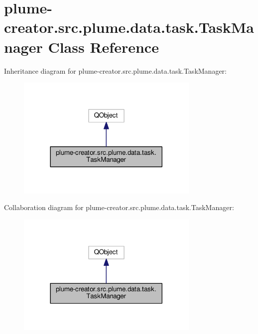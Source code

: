 \hypertarget{classplume-creator_1_1src_1_1plume_1_1data_1_1task_1_1_task_manager}{}\section{plume-\/creator.src.\+plume.\+data.\+task.\+Task\+Manager Class Reference}
\label{classplume-creator_1_1src_1_1plume_1_1data_1_1task_1_1_task_manager}


Inheritance diagram for plume-\/creator.src.\+plume.\+data.\+task.\+Task\+Manager\+:\nopagebreak
\begin{figure}[H]
\begin{center}
\leavevmode
\includegraphics[width=248pt]{classplume-creator_1_1src_1_1plume_1_1data_1_1task_1_1_task_manager__inherit__graph}
\end{center}
\end{figure}


Collaboration diagram for plume-\/creator.src.\+plume.\+data.\+task.\+Task\+Manager\+:\nopagebreak
\begin{figure}[H]
\begin{center}
\leavevmode
\includegraphics[width=248pt]{classplume-creator_1_1src_1_1plume_1_1data_1_1task_1_1_task_manager__coll__graph}
\end{center}
\end{figure}
